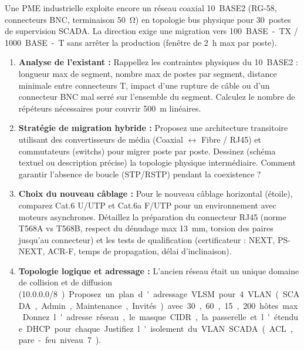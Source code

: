 \documentclass[11pt]{article}
\begin{document}
\begin{exercice}
Une PME industrielle exploite encore un réseau coaxial \SI{10}{BASE2} (RG-58, connecteurs BNC, terminaison \SI{50}{\ohm}) en topologie bus physique pour \SI{30}{postes} de supervision SCADA. La direction exige une migration vers \SI{100}{BASE-TX} / \SI{1000}{BASE-T} sans arrêter la production (fenêtre de \SI{2}{h} max par poste).
\begin{enumerate}
    \item \textbf{Analyse de l'existant :} Rappellez les contraintes physiques du \SI{10}{BASE2} : longueur max de segment, nombre max de postes par segment, distance minimale entre connecteurs T, impact d'une rupture de câble ou d'un connecteur BNC mal serré sur l'ensemble du segment. Calculez le nombre de répéteurs nécessaires pour couvrir \SI{500}{m} linéaires.
    \item \textbf{Stratégie de migration hybride :} Proposez une architecture transitoire utilisant des convertisseurs de média (Coaxial $\leftrightarrow$ Fibre / RJ45) et commutateurs (switchs) pour migrer poste par poste. Dessinez (schéma textuel ou description précise) la topologie physique intermédiaire. Comment garantir l'absence de boucle (STP/RSTP) pendant la coexistence ?
    \item \textbf{Choix du nouveau câblage :} Pour le nouveau câblage horizontal (étoile), comparez Cat.6 U/UTP et Cat.6a F/UTP pour un environnement avec moteurs asynchrones. Détaillez la préparation du connecteur RJ45 (norme T568A vs T568B, respect du dénudage max \SI{13}{mm}, torsion des paires jusqu'au connecteur) et les tests de qualification (certificateur : NEXT, PS-NEXT, ACR-F, temps de propagation, délai d'inclinaison).
    \item \textbf{Topologie logique et adressage :} L'ancien réseau était un unique domaine de collision et de diffusion (\SI{10.0.0.0/8}). Proposez un plan d'adressage VLSM pour 4 VLAN (SCADA, Admin, Maintenance, Invités) avec \SI{30}, \SI{60}, \SI{15}, \SI{200} hôtes max. Donnez l'adresse réseau, le masque CIDR, la passerelle et l'étendue DHCP pour chaque. Justifiez l'isolement du VLAN SCADA (ACL, pare-feu niveau 7).
\end{enumerate}
\end{exercice}
\end{document}
